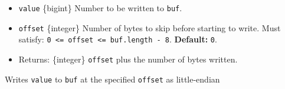 \begin{itemize}
\tightlist
\item
  \texttt{value} \{bigint\} Number to be written to \texttt{buf}.
\item
  \texttt{offset} \{integer\} Number of bytes to skip before starting to
  write. Must satisfy:
  \texttt{0\ \textless{}=\ offset\ \textless{}=\ buf.length\ -\ 8}.
  \textbf{Default:} \texttt{0}.
\item
  Returns: \{integer\} \texttt{offset} plus the number of bytes written.
\end{itemize}

Writes \texttt{value} to \texttt{buf} at the specified \texttt{offset}
as little-endian

\begin{Shaded}
\begin{Highlighting}[]
\NormalTok{ \{ }\NormalTok{ \} } \OperatorTok{;}

\OperatorTok{=} \NormalTok{(}\NormalTok{)}\OperatorTok{;}

\NormalTok{(}\OperatorTok{,} \NormalTok{)}\OperatorTok{;}

\OperatorTok{;}
\end{Highlighting}
\end{Shaded}

\begin{Shaded}
\begin{Highlighting}[]
\NormalTok{ \{ }\NormalTok{ \} }\OperatorTok{=} \NormalTok{(}\NormalTok{)}\OperatorTok{;}

\OperatorTok{=} \NormalTok{(}\NormalTok{)}\OperatorTok{;}

\NormalTok{(}\OperatorTok{,} \NormalTok{)}\OperatorTok{;}

\OperatorTok{;}
\end{Highlighting}
\end{Shaded}

